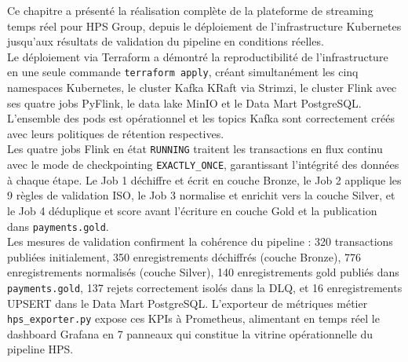 Ce chapitre a présenté la réalisation complète de la plateforme de streaming temps réel pour HPS Group, depuis le déploiement de l'infrastructure Kubernetes jusqu'aux résultats de validation du pipeline en conditions réelles.
\\[0.3cm]
Le déploiement via Terraform a démontré la reproductibilité de l'infrastructure en une seule commande \texttt{terraform apply}, créant simultanément les cinq namespaces Kubernetes, le cluster Kafka KRaft via Strimzi, le cluster Flink avec ses quatre jobs PyFlink, le data lake MinIO et le Data Mart PostgreSQL. L'ensemble des pods est opérationnel et les topics Kafka sont correctement créés avec leurs politiques de rétention respectives.
\\[0.3cm]
Les quatre jobs Flink en état \texttt{RUNNING} traitent les transactions en flux continu avec le mode de checkpointing \texttt{EXACTLY\_ONCE}, garantissant l'intégrité des données à chaque étape. Le Job 1 déchiffre et écrit en couche Bronze, le Job 2 applique les 9 règles de validation ISO, le Job 3 normalise et enrichit vers la couche Silver, et le Job 4 déduplique et score avant l'écriture en couche Gold et la publication dans \texttt{payments.gold}.
\\[0.3cm]
Les mesures de validation confirment la cohérence du pipeline : 320 transactions publiées initialement, 350 enregistrements déchiffrés (couche Bronze), 776 enregistrements normalisés (couche Silver), 140 enregistrements gold publiés dans \texttt{payments.gold}, 137 rejets correctement isolés dans la DLQ, et 16 enregistrements UPSERT dans le Data Mart PostgreSQL. L'exporteur de métriques métier \texttt{hps\_exporter.py} expose ces KPIs à Prometheus, alimentant en temps réel le dashboard Grafana en 7 panneaux qui constitue la vitrine opérationnelle du pipeline HPS.

\newpage
